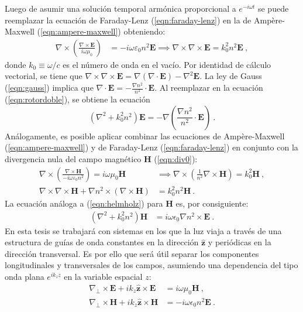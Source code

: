 Luego de asumir una solución temporal armónica proporcional a $e^{-i\omega t}$ se puede reemplazar la ecuación de Faraday-Lenz (\ref{eqn:faraday-lenz}) en la de Ampère-Maxwell (\ref{eqn:ampere-maxwell}) obteniendo:
\begin{align}
	\nabla\times\left(\frac{\nabla\times\textbf{E}}{i\omega\mu_0}\right) &= -i\omega \varepsilon_0 n^2 \textbf{E} \implies \nabla\times\nabla\times\textbf{E} = k_0^2n^2\textbf{E} \ , \label{eqn:rotordoble}
\end{align}
donde $k_0 \equiv \omega/c$ es el número de onda en el vacío. Por identidad de cálculo vectorial, se tiene que $\nabla\times\nabla\times\textbf{E} = \nabla(\nabla\cdot\textbf{E}) - \nabla^2\textbf{E}$. La ley de Gauss (\ref{eqn:gauss}) implica que $\nabla\cdot \textbf{E} = -\frac{\nabla n^2}{n^2}\cdot\textbf{E}$. Al reemplazar en la ecuación (\ref{eqn:rotordoble}), se obtiene la ecuación 
\begin{equation}
	\left(\nabla^2  + k_0^2n^2\right)\textbf{E} = -\nabla\left( \frac{\nabla n^2}{n^2} \cdot \textbf{E}  \right) \ . \label{eqn:helmholz}
\end{equation}
Análogamente, es posible aplicar combinar las ecuaciones de Ampère-Maxwell (\ref{eqn:ampere-maxwell}) y de Faraday-Lenz (\ref{eqn:faraday-lenz}) en conjunto con la divergencia nula del campo magnético \textbf{H} (\ref{eqn:div0}):
\begin{align}
	\nabla\times \left(\frac{\nabla\times\textbf{H}}{-i\omega \varepsilon_0 n^2}\right) = i\omega \mu_0 \textbf{H} &\implies \nabla\times \left(\frac{1}{n^2}\nabla\times\textbf{H}\right) = k_0^2 \textbf{H} \ ,
	\nonumber
	\\
	\nabla\times\nabla\times\textbf{H} + \nabla n^2 \times \left( \nabla\times\textbf{H}\right)
	&= 
	  k_0^2 n^2\textbf{H} \ .
	 	\nonumber
\end{align}
La ecuación análoga a (\ref{eqn:helmholz}) para \textbf{H} es, por consiguiente:
\begin{align}
	 \left(\nabla^2  + k_0^2 n^2 \right) \textbf{H} &= i\omega \epsilon_0 \nabla n^2 \times \textbf{E} \ .
	 \label{eqn:helmholzH}
\end{align}
En esta tesis se trabajará con sistemas en los que la luz viaja a través de una estructura de guías de onda constantes en la dirección $\hat{\textbf{z}}$ y periódicas en la dirección transversal. Es por ello que será útil separar los componentes longitudinales y transversales de los campos, asumiendo una dependencia del tipo onda plana $e^{i k_z z}$ en la variable espacial $z$:
\begin{align}
	\nabla_\perp \times  \textbf{E} + ik_z \hat{\textbf{z}} \times \textbf{E} &= i\omega\mu_0\textbf{H} \ ,
	\label{eqn:EfieldH}
	\\
	\nabla_\perp \times  \textbf{H} + ik_z \hat{\textbf{z}} \times \textbf{H} &= -i\omega \epsilon_0 n^2 \textbf{E} \ .
	\label{eqn:HfieldE}
\end{align}
